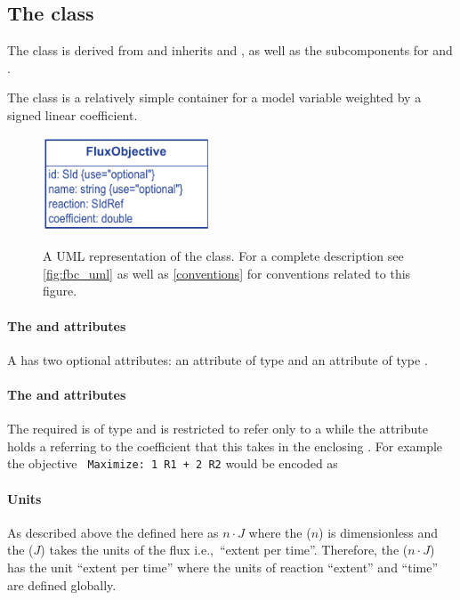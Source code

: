 \subsection{The \FBC {} class}
\label{fluxobjective-class}

The \FBC \FluxObjective class is derived from \SBML \SBase and inherits
 and , as well as the subcomponents for
\Annotation and \Notes.

The \FluxObjective class is a relatively simple container for a model
variable weighted by a signed linear coefficient.

%
\begin{figure}[ht]
  \centering
  \includegraphics[width=5cm]{images/v2harmony_fbc_fluxobjective.pdf}\\
  \caption{A UML representation of the \FBCPackage \FluxObjective class. For a complete description see \ref{fig:fbc_uml} as well as \ref{conventions} for conventions related to this figure.}
  \label{fig:fbc_uml_fobj}
\end{figure}

\paragraph{The  and  attributes}
A \FluxObjective has two optional attributes:  an attribute of
type  and  an attribute of type .

\pagebreak
\paragraph{The  and  attributes}
The required  is of type  and is restricted
to refer only to a \Reaction while the  attribute
holds a  referring to the coefficient that this \FluxObjective
takes in the enclosing \Objective. For example the objective
\texttt{ Maximize: 1 R1 + 2 R2} would be encoded as
%


\paragraph{Units}
As described above the \FluxObjective defined here as $n\cdot J$ where
the  ($n$) is dimensionless and the  ($J$)
takes the units of the  flux i.e.,~``extent per time''.
Therefore, the \FluxObjective ($n\cdot J$)  has the unit ``extent per time''
where the units of reaction ``extent'' and ``time'' are defined globally.


